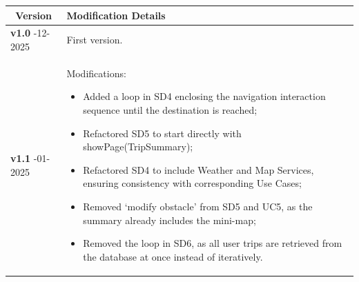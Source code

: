 \noindent
\begin{tabularx}{\textwidth}{ p{2.5cm} | X } 
    \hline
    \multicolumn{1}{c|}{\textbf{Version}} & \textbf{Modification Details} \\ 
    \hline
    
    \raggedleft \textbf{v1.0} \newline 23-12-2025 & First version. \\ 
    \hline
    
    \raggedleft \textbf{v1.1} \newline 25-01-2025 & Modifications:
    \begin{itemize}[leftmargin=*, nosep, after=\vspace{\baselineskip}]
        \item Added a loop in SD4 enclosing the navigation interaction sequence until the destination is reached;
        \item Refactored SD5 to start directly with showPage(TripSummary);
        \item Refactored SD4 to include Weather and Map Services, ensuring consistency with corresponding Use Cases;
        \item Removed `modify obstacle' from SD5 and UC5, as the summary already includes the mini-map;
        \item Removed the loop in SD6, as all user trips are retrieved from the database at once instead of iteratively.
        
    \end{itemize} \\ 
    \hline
\end{tabularx}